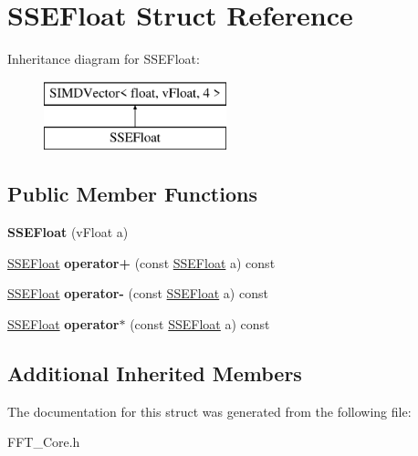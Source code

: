 \hypertarget{struct_s_s_e_float}{}\section{S\+S\+E\+Float Struct Reference}
\label{struct_s_s_e_float}
Inheritance diagram for S\+S\+E\+Float\+:\begin{figure}[H]
\begin{center}
\leavevmode
\includegraphics[height=2.000000cm]{struct_s_s_e_float}
\end{center}
\end{figure}
\subsection*{Public Member Functions}
\begin{DoxyCompactItemize}
\item 
\mbox{\label{struct_s_s_e_float_a6f6c055ae305555a4a7278bf0ad7b6c9}} 
{\bfseries S\+S\+E\+Float} (v\+Float a)
\item 
\mbox{\label{struct_s_s_e_float_abb2b57cfba1926a7531621fd8fe0ed2c}} 
\hyperlink{struct_s_s_e_float}{S\+S\+E\+Float} {\bfseries operator+} (const \hyperlink{struct_s_s_e_float}{S\+S\+E\+Float} a) const
\item 
\mbox{\label{struct_s_s_e_float_ac2eb0341eb44bf59702db1ba8e008c9a}} 
\hyperlink{struct_s_s_e_float}{S\+S\+E\+Float} {\bfseries operator-\/} (const \hyperlink{struct_s_s_e_float}{S\+S\+E\+Float} a) const
\item 
\mbox{\label{struct_s_s_e_float_a0a900db5f210db5000c37e7730c42c99}} 
\hyperlink{struct_s_s_e_float}{S\+S\+E\+Float} {\bfseries operator$\ast$} (const \hyperlink{struct_s_s_e_float}{S\+S\+E\+Float} a) const
\end{DoxyCompactItemize}
\subsection*{Additional Inherited Members}


The documentation for this struct was generated from the following file\+:\begin{DoxyCompactItemize}
\item 
F\+F\+T\+\_\+\+Core.\+h\end{DoxyCompactItemize}
